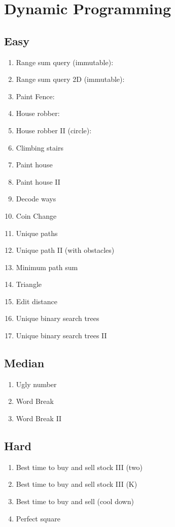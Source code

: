 \documentclass[DIV=calc, paper=a4, fontsize=11pt, twocolumn]{scrartcl}	 %
\begin{document}
\section*{Dynamic Programming}

\subsection*{Easy}
\begin{enumerate}
\item Range sum query (immutable): \cite{303}
\item Range sum query 2D (immutable): \cite{304}
\item Paint Fence: \cite{276} 
\item House robber: \cite{198} 
\item House robber II (circle): \cite{213} 
\item Climbing stairs \cite{070} 
\item Paint house \cite{256} 
\item Paint house II \cite{265} 
\item Decode ways \cite{091} 
\item Coin Change \cite{322} 
\item Unique paths \cite{062}
\item Unique path II (with obstacles) \cite{063}
\item Minimum path sum \cite{064} 
\item Triangle \cite{120}
\item Edit distance \cite{072}
\item Unique binary search trees \cite{095} 
\item Unique binary search trees II \cite{096} 
\end{enumerate}
\subsection*{Median} 
\begin{enumerate}
\item Ugly number
\item Word Break \cite{139}
\item Word Break II \cite{140}
\end{enumerate}
\subsection*{Hard}
\begin{enumerate}
\item Best time to buy and sell stock III (two)
\item Best time to buy and sell stock III (K)
\item Best time to buy and sell (cool down)
\item Perfect square
\end{enumerate}
\end{document}
